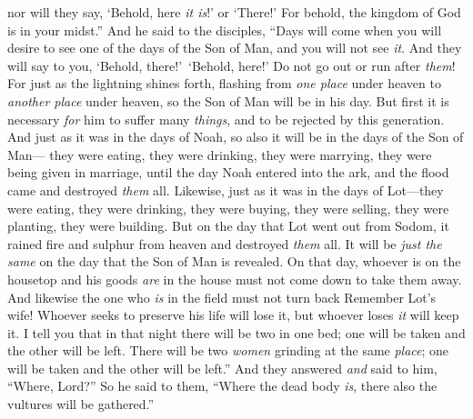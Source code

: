 \begin{biblechapter}
\verse nor will they say, ‘Behold, here \textit{it is}!’ or ‘There!’ For behold, the kingdom of God is in your midst.”
 And he said to the disciples, “Days will come when you will desire to see one of the days of the Son of Man, and you will not see \textit{it}.
\verse And they will say to you, ‘Behold, there!’ ‘Behold, here!’ Do not go out or run after \textit{them}!
\verse For just as the lightning shines forth, flashing from \textit{one place} under heaven to \textit{another place} under heaven, so the Son of Man will be in his day.
\verse But first it is necessary \textit{for} him to suffer many \textit{things}, and to be rejected by this generation.
\verse And just as it was in the days of Noah, so also it will be in the days of the Son of Man—
\verse they were eating, they were drinking, they were marrying, they were being given in marriage, until the day Noah entered into the ark, and the flood came and destroyed \textit{them} all.
\verse Likewise, just as it was in the days of Lot—they were eating, they were drinking, they were buying, they were selling, they were planting, they were building.
\verse But on the day that Lot went out from Sodom, it rained fire and sulphur from heaven and destroyed \textit{them} all.
\verse It will be \textit{just the same} on the day that the Son of Man is revealed.
\verse On that day, whoever is on the housetop and his goods \textit{are} in the house must not come down to take them away. And likewise the one who \textit{is} in the field must not turn back
\verse Remember Lot’s wife!
\verse Whoever seeks to preserve his life will lose it, but whoever loses \textit{it} will keep it.
\verse I tell you that in that night there will be two in one bed; one will be taken and the other will be left.
\verse There will be two \textit{women} grinding at the same \textit{place}; one will be taken and the other will be left.”
\verse And they answered \textit{and} said to him, “Where, Lord?” So he said to them, “Where the dead body \textit{is}, there also the vultures will be gathered.”
\end{biblechapter}

